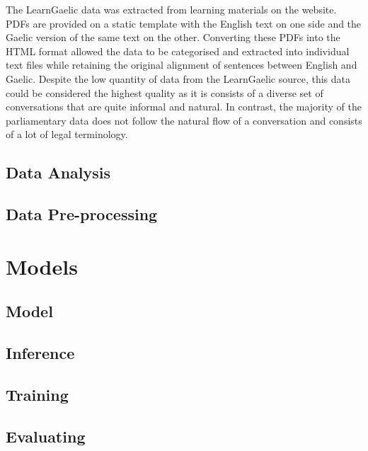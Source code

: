 The LearnGaelic data was extracted from learning materials on the \cite{learn_gaelic_2019} website. PDFs are provided on a static template with the English text on one side and the Gaelic version of the same text on the other. Converting these PDFs into the HTML format allowed the data to be categorised and extracted into individual text files while retaining the original alignment of sentences between English and Gaelic.
Despite the low quantity of data from the LearnGaelic source, this data could be considered the highest quality as it is consists of a diverse set of conversations that are quite informal and natural. In contrast, the majority of the parliamentary data does not follow the natural flow of a conversation and consists of a lot of legal terminology.

\subsection{Data Analysis}

\subsection{Data Pre-processing}



\newpage
\section{Models}

\subsection{Model}

\subsection{Inference}

\subsection{Training}

\subsection{Evaluating}


